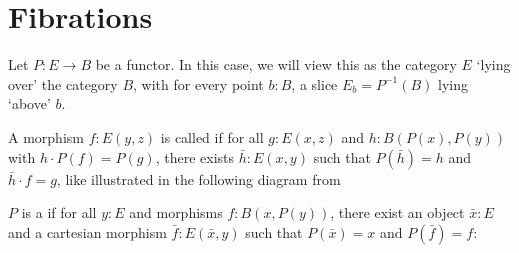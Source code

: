 \section{Fibrations}
Let $ P : E \to B $ be a functor. In this case, we will view this as the category $ E $ `lying over' the category $ B $, with for every point $ b: B $, a slice $ E_b = P^{-1}(B) $ lying `above' $ b $.

\begin{definition}
  A morphism $ f: E(y, z) $ is called  if for all $ g: E(x, z) $ and $ h: B(P(x), P(y)) $ with $ h \cdot P(f) = P(g) $, there exists $ \bar h: E(x, y) $ such that $ P(\bar h) = h $ and $ \bar h \cdot f = g $, like illustrated in the following diagram from \autocite{nlab:grothendieck_fibration}
  \begin{center}
  \end{center}
\end{definition}

\begin{definition}
  $ P $ is a  if for all $ y: E $ and morphisms $ f: B(x, P(y)) $, there exist an object $ \bar x: E $ and a cartesian morphism $ \bar f: E(\bar x, y) $ such that $ P(\bar x) = x $ and $ P(\bar f) = f $:
  \begin{center}
  \end{center}
\end{definition}

